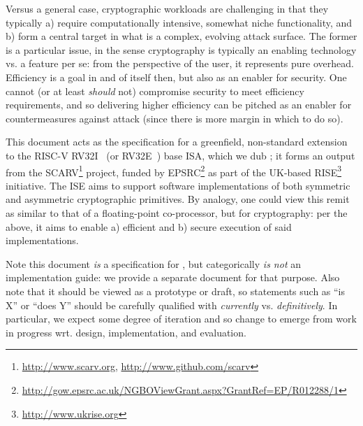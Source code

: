 
Versus a general case, cryptographic workloads are challenging in that they
typically
a) require computationally intensive, somewhat niche functionality,
   and
b) form a central target in what is a complex, evolving attack surface.
The former is a particular issue, in the sense cryptography is typically an
enabling technology vs. a feature per se: from the perspective of the user,
it represents pure overhead.  Efficiency is a goal in and of itself then, 
but also as an enabler for security.  One cannot (or at least {\em should} 
not) compromise security to meet efficiency requirements, and so delivering
higher efficiency can be pitched as an enabler for countermeasures against 
attack (since there is more margin in which to do so).

This document acts as the specification for a 
greenfield, non-standard extension~\cite[Section 21.1]{SCARV:RV:ISA:I:17} 
to the RISC-V 
RV32I~\cite[Section 2]{SCARV:RV:ISA:I:17} (or RV32E~\cite[Section 3]{SCARV:RV:ISA:I:17})
base ISA, which we dub \XCID; it forms an output from the SCARV\footnote{
\url{http://www.scarv.org}, \url{http://www.github.com/scarv}
} project, funded by EPSRC\footnote{
\url{http://gow.epsrc.ac.uk/NGBOViewGrant.aspx?GrantRef=EP/R012288/1}
} as part of the UK-based RISE\footnote{
\url{http://www.ukrise.org}
} initiative.
The \XCID ISE aims to support software implementations of both symmetric and 
asymmetric cryptographic primitives.  By analogy, one could view this remit
as similar to that of a floating-point co-processor, but for cryptography: 
per the above, it aims to enable
a) efficient
   and
b) secure
execution of said implementations.

Note this document {\em is} a specification for \XCID, but categorically
{\em is not} an implementation guide: we provide a separate document for 
that purpose.
Also note that it should be viewed as a prototype or draft, so statements 
such as 
``\XCID is   X'' 
or
``\XCID does Y''
should be carefully qualified with {\em currently} vs. {\em definitively}.  
In particular, we expect some degree of iteration and so change to emerge 
from work in progress wrt. design, implementation, and evaluation.

